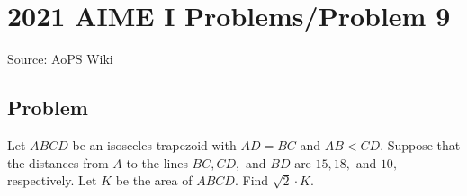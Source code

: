 \documentclass[12pt]{article}
\begin{document}
\section*{{2021 AIME I Problems/Problem 9}}
Source: AoPS Wiki

\subsection*{Problem}
Let $ABCD$ be an isosceles trapezoid with $AD=BC$ and $AB<CD.$ Suppose that the distances from $A$ to the lines $BC,CD,$ and $BD$ are $15,18,$ and $10,$ respectively. Let $K$ be the area of $ABCD.$ Find $\sqrt2 \cdot K.$
\end{document}
